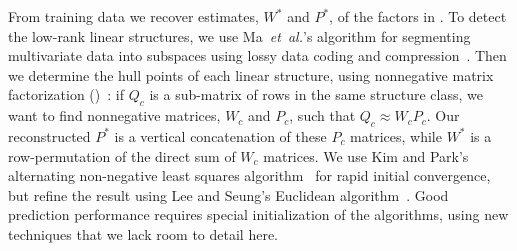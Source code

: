 \documentclass{acm_proc_article-sp}
\begin{document}

From training data we recover estimates, $W^*$ and $P^*$, of the factors in .
To detect the low-rank linear structures, we use Ma~\emph{et~al.}'s algorithm for segmenting multivariate data into subspaces using lossy data coding and compression~\cite{Ma07}.
Then we determine the hull points of each linear structure, using nonnegative matrix factorization ()~\cite{Lee01,Kim08:anls}:
if $Q_c$ is a sub-matrix of rows in the same structure class, we want to find nonnegative matrices, $W_c$ and $P_c$, such that $Q_c \approx W_c P_c$.
Our reconstructed $P^*$ is a vertical concatenation of these $P_c$ matrices, while $W^*$ is a row-permutation of the direct sum of $W_c$ matrices.
We use Kim and Park's alternating non-negative least squares algorithm~\cite{Kim08:anls} for rapid initial convergence, but refine the result using Lee and Seung's Euclidean algorithm~\cite{Lee01}.
Good prediction performance requires special initialization of the  algorithms, using new techniques that we lack room to detail here.
\end{document}
